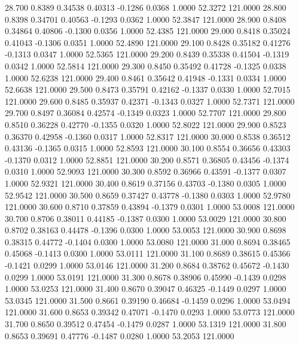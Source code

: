   28.700   0.8389   0.34538   0.40313  -0.1286   0.0368   1.0000  52.3272 121.0000
  28.800   0.8398   0.34701   0.40563  -0.1293   0.0362   1.0000  52.3847 121.0000
  28.900   0.8408   0.34864   0.40806  -0.1300   0.0356   1.0000  52.4385 121.0000
  29.000   0.8418   0.35024   0.41043  -0.1306   0.0351   1.0000  52.4890 121.0000
  29.100   0.8428   0.35182   0.41276  -0.1313   0.0347   1.0000  52.5365 121.0000
  29.200   0.8439   0.35338   0.41504  -0.1319   0.0342   1.0000  52.5814 121.0000
  29.300   0.8450   0.35492   0.41728  -0.1325   0.0338   1.0000  52.6238 121.0000
  29.400   0.8461   0.35642   0.41948  -0.1331   0.0334   1.0000  52.6638 121.0000
  29.500   0.8473   0.35791   0.42162  -0.1337   0.0330   1.0000  52.7015 121.0000
  29.600   0.8485   0.35937   0.42371  -0.1343   0.0327   1.0000  52.7371 121.0000
  29.700   0.8497   0.36084   0.42574  -0.1349   0.0323   1.0000  52.7707 121.0000
  29.800   0.8510   0.36228   0.42770  -0.1355   0.0320   1.0000  52.8022 121.0000
  29.900   0.8523   0.36370   0.42958  -0.1360   0.0317   1.0000  52.8317 121.0000
  30.000   0.8538   0.36512   0.43136  -0.1365   0.0315   1.0000  52.8593 121.0000
  30.100   0.8554   0.36656   0.43303  -0.1370   0.0312   1.0000  52.8851 121.0000
  30.200   0.8571   0.36805   0.43456  -0.1374   0.0310   1.0000  52.9093 121.0000
  30.300   0.8592   0.36966   0.43591  -0.1377   0.0307   1.0000  52.9321 121.0000
  30.400   0.8619   0.37156   0.43703  -0.1380   0.0305   1.0000  52.9542 121.0000
  30.500   0.8659   0.37427   0.43778  -0.1380   0.0303   1.0000  52.9780 121.0000
  30.600   0.8710   0.37859   0.43894  -0.1379   0.0301   1.0000  53.0008 121.0000
  30.700   0.8706   0.38011   0.44185  -0.1387   0.0300   1.0000  53.0029 121.0000
  30.800   0.8702   0.38163   0.44478  -0.1396   0.0300   1.0000  53.0053 121.0000
  30.900   0.8698   0.38315   0.44772  -0.1404   0.0300   1.0000  53.0080 121.0000
  31.000   0.8694   0.38465   0.45068  -0.1413   0.0300   1.0000  53.0111 121.0000
  31.100   0.8689   0.38615   0.45366  -0.1421   0.0299   1.0000  53.0146 121.0000
  31.200   0.8684   0.38762   0.45672  -0.1430   0.0299   1.0000  53.0191 121.0000
  31.300   0.8678   0.38906   0.45990  -0.1439   0.0298   1.0000  53.0253 121.0000
  31.400   0.8670   0.39047   0.46325  -0.1449   0.0297   1.0000  53.0345 121.0000
  31.500   0.8661   0.39190   0.46684  -0.1459   0.0296   1.0000  53.0494 121.0000
  31.600   0.8653   0.39342   0.47071  -0.1470   0.0293   1.0000  53.0773 121.0000
  31.700   0.8650   0.39512   0.47454  -0.1479   0.0287   1.0000  53.1319 121.0000
  31.800   0.8653   0.39691   0.47776  -0.1487   0.0280   1.0000  53.2053 121.0000
